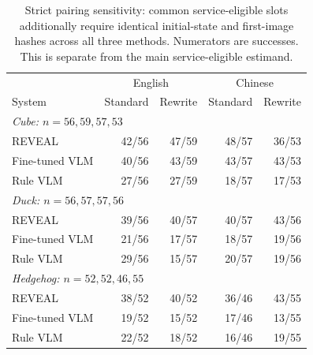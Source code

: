 \begin{table}[t]
\centering\footnotesize
\setlength{\tabcolsep}{2pt}
\begin{tabular}{@{}lrrrr@{}}
\toprule
 & \multicolumn{2}{c}{English} & \multicolumn{2}{c}{Chinese}\\
System & Standard & Rewrite & Standard & Rewrite\\
\midrule
\multicolumn{5}{l}{\textit{Cube: $n=56, 59, 57, 53$}}\\
REVEAL & 42/56 & 47/59 & 48/57 & 36/53\\
Fine-tuned VLM & 40/56 & 43/59 & 43/57 & 43/53\\
Rule VLM & 27/56 & 27/59 & 18/57 & 17/53\\
\midrule
\multicolumn{5}{l}{\textit{Duck: $n=56, 57, 57, 56$}}\\
REVEAL & 39/56 & 40/57 & 40/57 & 43/56\\
Fine-tuned VLM & 21/56 & 17/57 & 18/57 & 19/56\\
Rule VLM & 29/56 & 15/57 & 20/57 & 19/56\\
\midrule
\multicolumn{5}{l}{\textit{Hedgehog: $n=52, 52, 46, 55$}}\\
REVEAL & 38/52 & 40/52 & 36/46 & 43/55\\
Fine-tuned VLM & 19/52 & 15/52 & 17/46 & 13/55\\
Rule VLM & 22/52 & 18/52 & 16/46 & 19/55\\
\bottomrule
\end{tabular}
\caption{Strict pairing sensitivity: common service-eligible slots additionally require identical initial-state and first-image hashes across all three methods. Numerators are successes. This is separate from the main service-eligible estimand.}
\label{tab:language-sensitivity}
\end{table}

